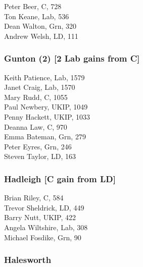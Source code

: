 \documentclass[a4paper,openany,10pt]{book}
\begin{document}
Peter Beer, C, 728\\
Ton Keane, Lab, 536\\
Dean Walton, Grn, 320\\
Andrew Welsh, LD, 111\\


\subsubsection*{Gunton (2) \hspace*{\fill}\nolinebreak[1]%
\enspace\hspace*{\fill}
[2 Lab gains from C]}



Keith Patience, Lab, 1579\\
Janet Craig, Lab, 1570\\
Mary Rudd, C, 1055\\
Paul Newbery, UKIP, 1049\\
Penny Hackett, UKIP, 1033\\
Deanna Law, C, 970\\
Emma Bateman, Grn, 279\\
Peter Eyres, Grn, 246\\
Steven Taylor, LD, 163\\


\subsubsection*{Hadleigh \hspace*{\fill}\nolinebreak[1]%
\enspace\hspace*{\fill}
[C gain from LD]}



Brian Riley, C, 584\\
Trevor Sheldrick, LD, 449\\
Barry Nutt, UKIP, 422\\
Angela Wiltshire, Lab, 308\\
Michael Fosdike, Grn, 90\\


\subsubsection*{Halesworth}

\end{document}
